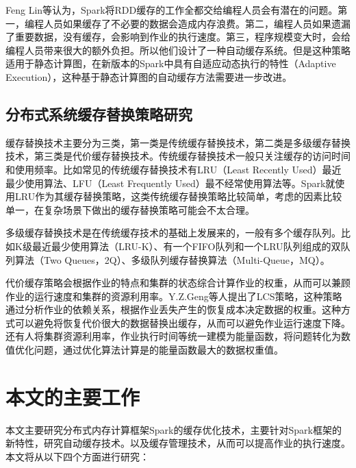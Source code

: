 Feng Lin等\cite{冯琳0集群计算引擎}认为，Spark将RDD缓存的工作全都交给编程人员会有潜在的问题。第一，编程人员如果缓存了不必要的数据会造成内存浪费。第二，编程人员如果遗漏了重要数据，没有缓存，会影响到作业的执行速度。第三，程序规模变大时，会给编程人员带来很大的额外负担。所以他们设计了一种自动缓存系统。但是这种策略适用于静态计算图，在新版本的Spark中具有自适应动态执行的特性（Adaptive Execution），这种基于静态计算图的自动缓存方法需要进一步改进。

\subsection{分布式系统缓存替换策略研究}

缓存替换技术主要分为三类，第一类是传统缓存替换技术，第二类是多级缓存替换技术，第三类是代价缓存替换技术。传统缓存替换技术一般只关注缓存的访问时间和使用频率。比如常见的传统缓存替换技术有LRU（Least Recently Used）最近最少使用算法、LFU（Least Frequently Used）最不经常使用算法等。Spark就使用LRU作为其缓存替换策略，这类传统缓存替换策略比较简单，考虑的因素比较单一，在复杂场景下做出的缓存替换策略可能会不太合理。

多级缓存替换技术是在传统缓存技术的基础上发展来的，一般有多个缓存队列。比如K级最近最少使用算法（LRU-K\cite{o1993lru}）、有一个FIFO队列和一个LRU队列组成的双队列算法（Two Queues，2Q\cite{dimitriou2015retrial}）、多级队列缓存替换算法（Multi-Queue，MQ\cite{li2015sparkbench}）。

代价缓存策略会根据作业的特点和集群的状态综合计算作业的权重，从而可以兼顾作业的运行速度和集群的资源利用率。Y.Z.Geng等人\cite{geng2014simulation}提出了LCS策略，这种策略通过分析作业的依赖关系，根据作业丢失产生的恢复成本决定数据的权重。这种方式可以避免将恢复代价很大的数据替换出缓存，从而可以避免作业运行速度下降。还有人将集群资源利用率，作业执行时间等统一建模为能量函数，将问题转化为数值优化问题，通过优化算法计算是的能量函数最大的数据权重值。

\section{本文的主要工作}

本文主要研究分布式内存计算框架Spark的缓存优化技术，主要针对Spark框架的新特性，研究自动缓存技术。以及缓存管理技术，从而可以提高作业的执行速度。本文将从以下四个方面进行研究：

